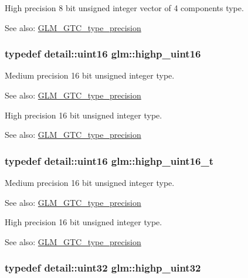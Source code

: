 High precision 8 bit unsigned integer vector of 4 components type. \begin{Desc}
\item[See also:]\hyperlink{group__gtc__type__precision}{GLM\_\-GTC\_\-type\_\-precision} \end{Desc}
\hypertarget{group__gtc__type__precision_g4d32967d45ba8365e2a05eaaac85e978}{
\subsubsection[highp\_\-uint16]{\setlength{\rightskip}{0pt plus 5cm}typedef detail::uint16 {\bf glm::highp\_\-uint16}}}
\label{group__gtc__type__precision_g4d32967d45ba8365e2a05eaaac85e978}


Medium precision 16 bit unsigned integer type. \begin{Desc}
\item[See also:]\hyperlink{group__gtc__type__precision}{GLM\_\-GTC\_\-type\_\-precision}\end{Desc}
High precision 16 bit unsigned integer type. \begin{Desc}
\item[See also:]\hyperlink{group__gtc__type__precision}{GLM\_\-GTC\_\-type\_\-precision} \end{Desc}
\hypertarget{group__gtc__type__precision_g3145bc0ee80432c165e985a188a722b3}{
\subsubsection[highp\_\-uint16\_\-t]{\setlength{\rightskip}{0pt plus 5cm}typedef detail::uint16 {\bf glm::highp\_\-uint16\_\-t}}}
\label{group__gtc__type__precision_g3145bc0ee80432c165e985a188a722b3}


Medium precision 16 bit unsigned integer type. \begin{Desc}
\item[See also:]\hyperlink{group__gtc__type__precision}{GLM\_\-GTC\_\-type\_\-precision}\end{Desc}
High precision 16 bit unsigned integer type. \begin{Desc}
\item[See also:]\hyperlink{group__gtc__type__precision}{GLM\_\-GTC\_\-type\_\-precision} \end{Desc}
\hypertarget{group__gtc__type__precision_g3145e44c73e2df7dfe4f3cb65974bf22}{
\subsubsection[highp\_\-uint32]{\setlength{\rightskip}{0pt plus 5cm}typedef detail::uint32 {\bf glm::highp\_\-uint32}}}
\label{group__gtc__type__precision_g3145e44c73e2df7dfe4f3cb65974bf22}


